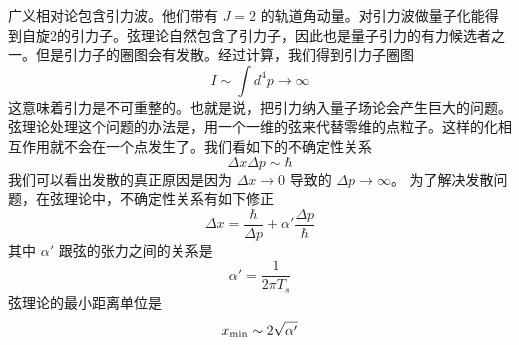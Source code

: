  
\begin{issues}
\issueNeedCite
\issueMissDepend
\end{issues}
 
 广义相对论包含引力波。他们带有 $J = 2$ 的轨道角动量。对引力波做量子化能得到自旋2的引力子。弦理论自然包含了引力子，因此也是量子引力的有力候选者之一。但是引力子的圈图会有发散。经过计算，我们得到引力子圈图
\begin{equation}
I \sim \int d^4 p \rightarrow \infty 
\end{equation}
这意味着引力是不可重整的。也就是说，把引力纳入量子场论会产生巨大的问题。弦理论处理这个问题的办法是，用一个一维的弦来代替零维的点粒子。这样的化相互作用就不会在一个点发生了。我们看如下的不确定性关系
\begin{equation}
\Delta x \Delta p \sim \hbar  
\end{equation}
我们可以看出发散的真正原因是因为 $\Delta x \rightarrow 0$ 导致的 $\Delta p \rightarrow  \infty  $。  为了解决发散问题，在弦理论中，不确定性关系有如下修正
\begin{equation}
\Delta x  = \frac{\hbar}{\Delta p} + \alpha' \frac{\Delta p}{\hbar }
\end{equation}
其中 $\alpha'$ 跟弦的张力之间的关系是
\begin{equation}
\alpha ' = \frac{1}{2 \pi T_s} 
\end{equation}
弦理论的最小距离单位是
\begin{equation}
x_{\rm min} \sim 2 \sqrt{\alpha'}
\end{equation}
